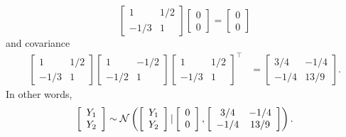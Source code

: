\documentclass[12pt, fullpage,letterpaper]{article}
\begin{document}
\begin{enumerate}
\begin{enumerate}
{	$$\left[\begin{array}{cc}1 & 1/2\\-1/3&1\end{array}\right]\left[\begin{array}{c}0 \\ 0\end{array}\right] = \left[\begin{array}{c}0 \\ 0\end{array}\right]$$
	and covariance 
	\begin{align*}
	\left[\begin{array}{cc}1 & 1/2\\-1/3&1\end{array}\right] \left[\begin{array}{cc}1 & -1/2 \\ -1/2 & 1\end{array}\right]\left[\begin{array}{cc}1 & 1/2\\-1/3&1\end{array}\right]^\top
	& = 
	\left[\begin{array}{cc}3/4 & -1/4\\-1/4&13/9\end{array}\right].
	\end{align*}
	In other words, 
	$$\left[\begin{array}{c}Y_1 \\ Y_2\end{array}\right] \sim \mathcal{N}\left(\left[\begin{array}{c}Y_1 \\ Y_2\end{array}\right]| \left[\begin{array}{c}0 \\ 0\end{array}\right], \left[\begin{array}{cc}3/4 & -1/4\\-1/4&13/9\end{array}\right]\right).$$
	}
\end{enumerate}



\end{enumerate}
\end{document}
